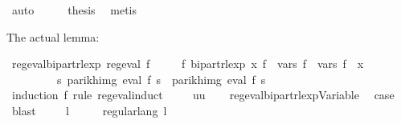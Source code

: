 \begin{isabellebody}
\ auto\isanewline
\ \ \isamarkupfalse%
\ \isamarkupfalse%
\ {\isacharquery}{\kern0pt}thesis\ \isamarkupfalse%
\ metis\isanewline
{}\isamarkupfalse%
%
\endisatagproof
{\isafoldproof}%
%
\isadelimproof
%
\endisadelimproof
%
\begin{isamarkuptext}%
The actual lemma:%
\end{isamarkuptext}\isamarkuptrue%
\isamarkupfalse%
\ reg{\isacharunderscore}{\kern0pt}eval{\isacharunderscore}{\kern0pt}bipart{\isacharunderscore}{\kern0pt}rlexp{\isacharcolon}{\kern0pt}\ {\isachardoublequoteopen}reg{\isacharunderscore}{\kern0pt}eval\ f\ {\isasymLongrightarrow}\isanewline
\ \ \ \ {\isasymexists}f{\isacharprime}{\kern0pt}{\isachardot}{\kern0pt}\ bipart{\isacharunderscore}{\kern0pt}rlexp\ x\ f{\isacharprime}{\kern0pt}\ {\isasymand}\ vars\ f{\isacharprime}{\kern0pt}\ {\isacharequal}{\kern0pt}\ vars\ f\ {\isasymunion}\ {\isacharbraceleft}{\kern0pt}x{\isacharbraceright}{\kern0pt}\ {\isasymand}\isanewline
\ \ \ \ \ \ \ \ \ {\isacharparenleft}{\kern0pt}{\isasymforall}s{\isachardot}{\kern0pt}\ parikh{\isacharunderscore}{\kern0pt}img\ {\isacharparenleft}{\kern0pt}eval\ f\ s{\isacharparenright}{\kern0pt}\ {\isacharequal}{\kern0pt}\ parikh{\isacharunderscore}{\kern0pt}img\ {\isacharparenleft}{\kern0pt}eval\ f{\isacharprime}{\kern0pt}\ s{\isacharparenright}{\kern0pt}{\isacharparenright}{\kern0pt}{\isachardoublequoteclose}\isanewline
%
\isadelimproof
%
\endisadelimproof
%
\isatagproof
{}\isamarkupfalse%
\ {\isacharparenleft}{\kern0pt}induction\ f\ rule{\isacharcolon}{\kern0pt}\ reg{\isacharunderscore}{\kern0pt}eval{\isachardot}{\kern0pt}induct{\isacharparenright}{\kern0pt}\isanewline
\ \ \isamarkupfalse%
\ {\isacharparenleft}{\kern0pt}{}\ uu{\isacharparenright}{\kern0pt}\isanewline
\ \ \isamarkupfalse%
\ reg{\isacharunderscore}{\kern0pt}eval{\isacharunderscore}{\kern0pt}bipart{\isacharunderscore}{\kern0pt}rlexp{\isacharunderscore}{\kern0pt}Variable\ \isamarkupfalse%
\ {\isacharquery}{\kern0pt}case\ \isamarkupfalse%
\ blast\isanewline
{}\isamarkupfalse%
\isanewline
\ \ \isamarkupfalse%
\ {\isacharparenleft}{\kern0pt}{}\ l{\isacharparenright}{\kern0pt}\isanewline
\ \ \isamarkupfalse%
\ \isamarkupfalse%
\ {\isachardoublequoteopen}regular{\isacharunderscore}{\kern0pt}lang\ l{\isachardoublequoteclose}\ \isamarkupfalse%

\end{isabellebody}
